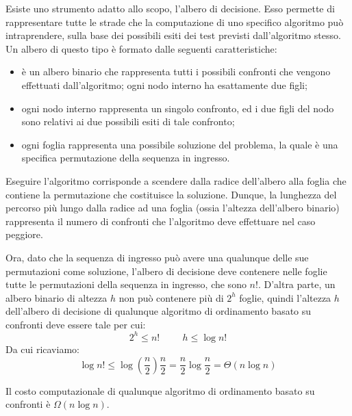 Esiste uno strumento adatto allo scopo, l’albero di decisione. Esso permette di rappresentare tutte le strade che la computazione di uno specifico algoritmo può intraprendere, sulla base dei possibili esiti dei test previsti dall'algoritmo stesso.
Un albero di questo tipo è formato dalle seguenti caratteristiche:
\begin{itemize}
    \item è un albero binario che rappresenta tutti i possibili confronti che vengono effettuati dall'algoritmo; ogni nodo interno ha esattamente due figli;
    \item ogni nodo interno rappresenta un singolo confronto, ed i due figli del nodo sono relativi ai due possibili esiti di tale confronto;
    \item ogni foglia rappresenta una possibile soluzione del problema, la quale è una specifica permutazione della sequenza in ingresso.
\end{itemize}

Eseguire l’algoritmo corrisponde a scendere dalla radice dell'albero alla foglia che contiene la permutazione che costituisce la soluzione. Dunque, la lunghezza del percorso più lungo dalla radice ad una foglia (ossia l’altezza dell'albero binario) rappresenta il numero di confronti che l’algoritmo deve effettuare nel caso peggiore.

Ora, dato che la sequenza di ingresso può avere una qualunque delle sue permutazioni come soluzione, l’albero di decisione deve contenere nelle foglie tutte le permutazioni della sequenza in ingresso, che sono $n!$. D’altra parte, un albero binario di altezza $h$ non può contenere più di $2^h$ foglie, quindi l’altezza $h$ dell'albero di decisione di qualunque algoritmo di ordinamento basato su confronti deve essere tale per cui:
\begin{equation*}
    2^h\leq n!\hspace{1cm}h\leq \log n!
\end{equation*}
Da cui ricaviamo:
\begin{equation*}
    \log n! \leq\log(\frac{n}{2})\frac{n}{2}=\frac{n}{2} \log \frac{n}{2} = \Theta(n\log n)
\end{equation*}

\begin{thm}
    Il costo computazionale di qualunque algoritmo di ordinamento basato su confronti è $\Omega(n \log n)$.
\end{thm}


